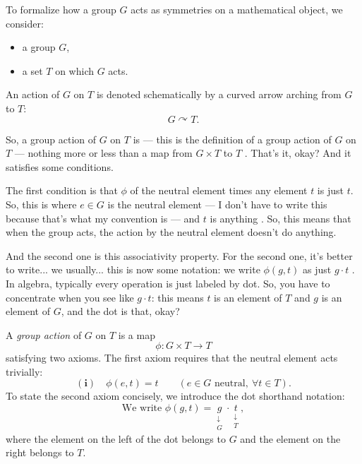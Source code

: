 \begin{content}
To formalize how a group $G$ acts as symmetries on a mathematical object, we consider:
\begin{itemize}
    \item a group $G$,
    \item a set $T$ on which $G$ acts.
\end{itemize}
An action of $G$ on $T$ is denoted schematically by a curved arrow arching from $G$ to $T$:
\[
G \curvearrowright T.
\]
\end{content}

\begin{speech}[00:45:06 - 00:46:40]
So, a group action of $G$ on $T$ is --- this is the definition of a group action of $G$ on $T$ --- nothing more or less than a map from $G \times T$ to $T$ . That's it, okay? And it satisfies some conditions.

The first condition is that $\phi$ of the neutral element times any element $t$ is just $t$. So, this is where $e \in G$ is the neutral element --- I don't have to write this because that's what my convention is --- and $t$ is anything . So, this means that when the group acts, the action by the neutral element doesn't do anything.

And the second one is this associativity property. For the second one, it's better to write... we usually... this is now some notation: we write $\phi(g, t)$ as just $g \cdot t$ . In algebra, typically every operation is just labeled by dot. So, you have to concentrate when you see like $g \cdot t$: this means $t$ is an element of $T$ and $g$ is an element of $G$, and the dot is that, okay?
\end{speech}

\begin{content}
A \emph{group action} of $G$ on $T$ is a map
\[
\phi \colon G \times T \longrightarrow T
\]
satisfying two axioms. The first axiom requires that the neutral element acts trivially:
\[
\mathbf{(i)} \quad \phi(e, t) = t \qquad (e \in G \text{ neutral},\ \forall t \in T).
\]
To state the second axiom concisely, we introduce the dot shorthand notation:
\[
\text{We write } \phi(g, t) = \underset{\substack{\downarrow\\G}}{g} \cdot \underset{\substack{\downarrow\\T}}{t},
\]
where the element on the left of the dot belongs to $G$ and the element on the right belongs to $T$.
\end{content}

